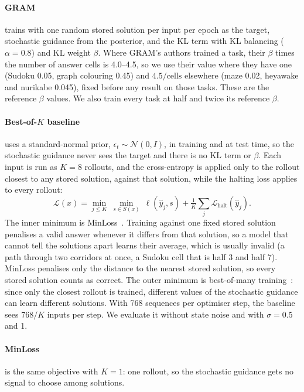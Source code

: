 \documentclass{article}
\newcommand{\Bok}{Best-of-$K$}
\begin{document}
\paragraph{GRAM} trains with one random stored solution per input per epoch as the target, stochastic guidance from the
posterior, and the KL term with KL balancing ($\alpha=0.8$) and KL weight $\beta$. Where GRAM's authors trained a task,
their $\beta$ times the number of answer cells is 4.0--4.5, so we use their value where they have one (Sudoku 0.05,
graph colouring 0.45) and $4.5/\text{cells}$ elsewhere (maze 0.02, heyawake and nurikabe 0.045), fixed before any
result on those tasks. These are the reference $\beta$ values. We also train every task at half and twice its
reference $\beta$.

\paragraph{\Bok{} baseline} uses a standard-normal prior, $\epsilon_t\sim\mathcal{N}(0,I)$, in training and at test
time, so the stochastic guidance never sees the target and there is no KL term or $\beta$. Each input is run as $K=8$
rollouts, and the cross-entropy is applied only to the rollout closest to any stored solution, against that solution,
while the halting loss applies to every rollout:
\begin{equation*}
  \mathcal{L}(x)=\min_{j\le K}\ \min_{s\in S(x)}\ \ell(\hat y_j,s) + \tfrac1K\textstyle\sum_j \mathcal{L}_{\text{halt}}(\hat y_j).
\end{equation*}
The inner minimum is MinLoss~\cite{nandwani2021oneofmany}. Training against one fixed stored solution penalises a
valid answer whenever it differs from that solution, so a model that cannot tell the solutions apart learns their
average, which is usually invalid (a path through two corridors at once, a Sudoku cell that is half 3 and half 7).
MinLoss penalises only the distance to the nearest stored solution, so every stored solution counts as correct. The
outer minimum is best-of-many training~\cite{bhattacharyya2018bestofmany}: since only the closest rollout is trained,
different values of the stochastic guidance can learn different solutions. With 768 sequences per optimiser step,
the baseline sees $768/K$ inputs per step. We evaluate it without state noise and with $\sigma=0.5$ and 1.

\paragraph{MinLoss} is the same objective with $K=1$: one rollout, so the stochastic guidance gets no signal to
choose among solutions.
\end{document}
